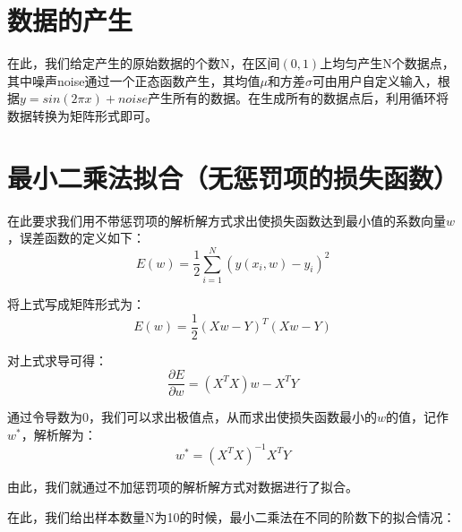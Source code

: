 \documentclass[12pt]{article}
\begin{document}
\section{数据的产生}
在此，我们给定产生的原始数据的个数N，在区间$(0,1)$上均匀产生N个数据点，其中噪声noise通过一个正态函数产生，其均值$\mu$和方差$\sigma$可由用户自定义输入，根据$y=sin(2\pi x)+noise$产生所有的数据。在生成所有的数据点后，利用循环将数据转换为矩阵形式即可。\par
\section{最小二乘法拟合（无惩罚项的损失函数）}
在此要求我们用不带惩罚项的解析解方式求出使损失函数达到最小值的系数向量$w$，误差函数的定义如下：
\[E(w)=\frac{1}{2}\sum_{i=1}^{N}({y(x_i,w)-y_i})^2\]\par
将上式写成矩阵形式为：
\[E(w)=\frac{1}{2}(Xw-Y)^T(Xw-Y)\]\par
对上式求导可得：
\[\frac{\partial E}{\partial w}=(X^TX)w-X^TY\]\par
通过令导数为0，我们可以求出极值点，从而求出使损失函数最小的$w$的值，记作$w^*$，解析解为：
\[w^*=(X^TX)^{-1}X^TY\]\par
由此，我们就通过不加惩罚项的解析解方式对数据进行了拟合。\par
在此，我们给出样本数量N为10的时候，最小二乘法在不同的阶数下的拟合情况：\par
\end{document}

